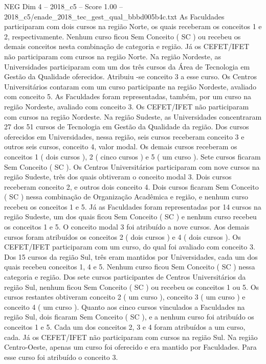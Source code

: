 \begin{textsample}{NEG Dim 4 – 2018\_c5 – Score 1.00 – 2018\_c5/enade\_2018\_tec\_gest\_qual\_bbbd005b4c.txt}
As Faculdades participaram com dois cursos na região Norte, os quais receberam os conceitos 1 e 2, respectivamente.
Nenhum curso ficou Sem Conceito ( SC ) ou recebeu os demais conceitos nesta combinação de categoria e região.
Já os CEFET/IFET não participaram com cursos na região Norte.
Na região Nordeste, as Universidades participaram com um dos três cursos da Área de Tecnologia em Gestão da Qualidade oferecidos.
Atribuiu -se conceito 3 a esse curso.
Os Centros Universitários contaram com um curso participante na região Nordeste, avaliado com conceito 5.
As Faculdades foram representadas, também, por um curso na região Nordeste, avaliado com conceito 3.
Os CEFET/IFET não participaram com cursos na região Nordeste.
Na região Sudeste, as Universidades concentraram 27 dos 51 cursos de Tecnologia em Gestão da Qualidade da região.
Dos cursos oferecidos em Universidades, nessa região, seis cursos receberam conceito 3 e outros seis cursos, conceito 4, valor modal.
Os demais cursos receberam os conceitos 1 ( dois cursos ), 2 ( cinco cursos ) e 5 ( um curso ).
Sete cursos ficaram Sem Conceito ( SC ).
Os Centros Universitários participaram com nove cursos na região Sudeste, três dos quais obtiveram o conceito modal 3.
Dois cursos receberam conceito 2, e outros dois conceito 4.
Dois cursos ficaram Sem Conceito ( SC ) nessa combinação de Organização Acadêmica e região, e nenhum curso recebeu os conceitos 1 e 5.
Já as Faculdades foram representadas por 14 cursos na região Sudeste, um dos quais ficou Sem Conceito ( SC ) e nenhum curso recebeu os conceitos 1 e 5.
O conceito modal 3 foi atribuído a nove cursos.
Aos demais cursos foram atribuídos os conceitos 2 ( dois cursos ) e 4 ( dois cursos ).
Os CEFET/IFET participaram com um curso, do qual foi avaliado com conceito 3.
Dos 15 cursos da região Sul, três eram mantidos por Universidades, cada um dos quais recebeu conceitos 1, 4 e 5.
Nenhum curso ficou Sem Conceito ( SC ) nessa categoria e região.
Dos sete cursos participantes de Centros Universitários da região Sul, nenhum ficou Sem Conceito ( SC ) ou recebeu os conceitos 1 ou 5.
Os cursos restantes obtiveram conceito 2 ( um curso ), conceito 3 ( um curso ) e conceito 4 ( um curso ).
Quanto aos cinco cursos vinculados a Faculdades na região Sul, dois ficaram Sem Conceito ( SC ), e a nenhum curso foi atribuído os conceitos 1 e 5.
Cada um dos conceitos 2, 3 e 4 foram atribuídos a um curso, cada.
Já os CEFET/IFET não participaram com cursos na região Sul.
Na região Centro-Oeste, apenas um curso foi oferecido e era mantido por Faculdades.
Para esse curso foi atribuído o conceito 3.

\end{textsample}
